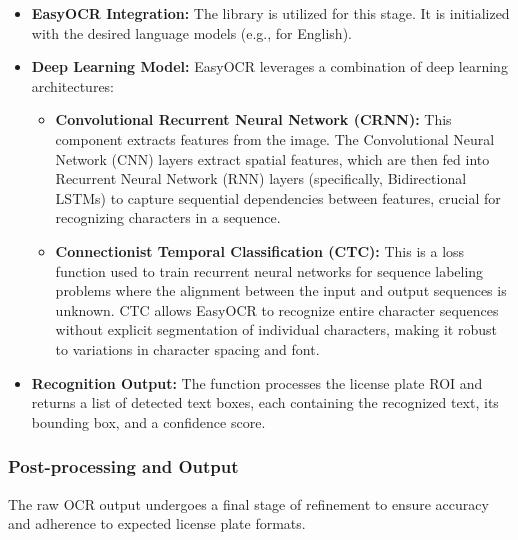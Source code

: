 \begin{itemize}
    \item \textbf{EasyOCR Integration:} The  library is utilized for this stage. It is initialized with the desired language models (e.g.,  for English).
    \item \textbf{Deep Learning Model:} EasyOCR leverages a combination of deep learning architectures:
    \begin{itemize}
        \item \textbf{Convolutional Recurrent Neural Network (CRNN):} This component extracts features from the image. The Convolutional Neural Network (CNN) layers extract spatial features, which are then fed into Recurrent Neural Network (RNN) layers (specifically, Bidirectional LSTMs) to capture sequential dependencies between features, crucial for recognizing characters in a sequence.
        \item \textbf{Connectionist Temporal Classification (CTC):} This is a loss function used to train recurrent neural networks for sequence labeling problems where the alignment between the input and output sequences is unknown. CTC allows EasyOCR to recognize entire character sequences without explicit segmentation of individual characters, making it robust to variations in character spacing and font.
    \end{itemize}
    \item \textbf{Recognition Output:} The  function processes the license plate ROI and returns a list of detected text boxes, each containing the recognized text, its bounding box, and a confidence score.
\end{itemize}

\subsubsection{Post-processing and Output}
\label{subsubsec:postprocessing}

The raw OCR output undergoes a final stage of refinement to ensure accuracy and adherence to expected license plate formats.

